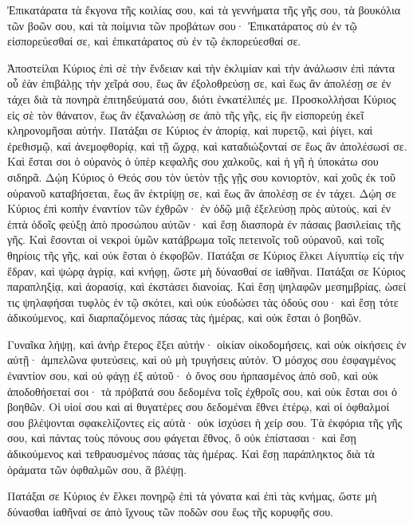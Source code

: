 {Ἐπικατάρατα τὰ ἔκγονα τῆς κοιλίας σου, καὶ τὰ γεννήματα τῆς γῆς σου, τὰ βουκόλια τῶν βοῶν σου, καὶ τὰ ποίμνια τῶν προβάτων σου·
Ἐπικατάρατος σὺ ἐν τῷ εἰσπορεύεσθαί σε, καὶ ἐπικατάρατος σὺ ἐν τῷ ἐκπορεύεσθαί σε.
\par }{\PP {}Ἀποστείλαι Κύριος ἐπὶ σὲ τὴν ἔνδειαν καὶ τὴν ἐκλιμίαν καὶ τὴν ἀνάλωσιν ἐπὶ πάντα οὗ ἐὰν ἐπιβάλῃς τὴν χεῖρά σου, ἕως ἂν ἐξολοθρεύσῃ σε, καὶ ἕως ἂν ἀπολέσῃ σε ἐν τάχει διὰ τὰ πονηρὰ ἐπιτηδεύματά σου, διότι ἐνκατέλιπές με.
Προσκολλήσαι Κύριος εἰς σὲ τὸν θάνατον, ἕως ἂν ἐξαναλώσῃ σε ἀπὸ τῆς γῆς, εἰς ἣν εἰσπορεύῃ ἐκεῖ κληρονομῆσαι αὐτήν.
Πατάξαι σε Κύριος ἐν ἀπορίᾳ, καὶ πυρετῷ, καὶ ῥίγει, καὶ ἐρεθισμῷ, καὶ ἀνεμοφθορίᾳ, καὶ τῇ ὤχρᾳ, καὶ καταδιώξονταί σε ἕως ἂν ἀπολέσωσί σε.
Καὶ ἔσται σοι ὁ οὐρανὸς ὁ ὑπὲρ κεφαλῆς σου χαλκοῦς, καὶ ἡ γῆ ἡ ὑποκάτω σου σιδηρᾶ.
Δῴη Κύριος ὁ Θεός σου τὸν ὑετὸν τῇς γῇς σου κονιορτὸν, καὶ χοῦς ἐκ τοῦ οὐρανοῦ καταβήσεται, ἕως ἂν ἐκτρίψῃ σε, καὶ ἕως ἂν ἀπολέσῃ σε ἐν τάχει.
Δῴη σε Κύριος ἐπὶ κοπὴν ἐναντίον τῶν ἐχθρῶν· ἐν ὁδῷ μιᾷ ἐξελεύσῃ πρὸς αὐτοὺς, καὶ ἐν ἑπτὰ ὁδοῖς φεύξῃ ἀπὸ προσώπου αὐτῶν· καὶ ἔσῃ διασπορὰ ἐν πάσαις βασιλείαις τῆς γῆς.
Καὶ ἔσονται οἱ νεκροὶ ὑμῶν κατάβρωμα τοῖς πετεινοῖς τοῦ οὐρανοῦ, καὶ τοῖς θηρίοις τῆς γῆς, καὶ οὐκ ἔσται ὁ ἐκφοβῶν.
Πατάξαι σε Κύριος ἕλκει Αἰγυπτίῳ εἰς τὴν ἕδραν, καὶ ψώρᾳ ἀγρίᾳ, καὶ κνήφῃ, ὥστε μὴ δύνασθαί σε ἰαθῆναι.
Πατάξαι σε Κύριος παραπληξίᾳ, καὶ ἀορασίᾳ, καὶ ἐκστάσει διανοίας.
Καὶ ἔσῃ ψηλαφῶν μεσημβρίας, ὡσεί τις ψηλαφήσαι τυφλὸς ἐν τῷ σκότει, καὶ οὐκ εὐοδώσει τὰς ὁδούς σου· καὶ ἔσῃ τότε ἀδικούμενος, καὶ διαρπαζόμενος πάσας τὰς ἡμέρας, καὶ οὐκ ἔσται ὁ βοηθῶν.
\par }{\PP {}Γυναῖκα λήψῃ, καὶ ἀνὴρ ἕτερος ἕξει αὐτήν· οἰκίαν οἰκοδομήσεις, καὶ οὐκ οἰκήσεις ἐν αὐτῇ· ἀμπελῶνα φυτεύσεις, καὶ οὐ μὴ τρυγήσεις αὐτόν.
Ὁ μόσχος σου ἐσφαγμένος ἐναντίον σου, καὶ οὐ φάγῃ ἐξ αὐτοῦ· ὁ ὄνος σου ἡρπασμένος ἀπὸ σοῦ, καὶ οὐκ ἀποδοθήσεταί σοι· τὰ πρόβατά σου δεδομένα τοῖς ἐχθροῖς σου,
καὶ οὐκ ἔσται σοι ὁ βοηθῶν. Οἱ υἱοί σου καὶ αἱ θυγατέρες σου δεδομέναι ἔθνει ἑτέρῳ, καὶ οἱ ὀφθαλμοί σου βλέψονται σφακελίζοντες εἰς αὐτὰ· οὐκ ἰσχύσει ἡ χείρ σου.
Τὰ ἐκφόρια τῆς γῆς σου, καὶ πάντας τοὺς πόνους σου φάγεται ἔθνος, ὃ οὐκ ἐπίστασαι· καὶ ἔσῃ ἀδικούμενος καὶ τεθραυσμένος πάσας τὰς ἡμέρας.
Καὶ ἔσῃ παράπληκτος διὰ τὰ ὁράματα τῶν ὀφθαλμῶν σου, ἃ βλέψῃ.
\par }{\PP {}Πατάξαι σε Κύριος ἐν ἕλκει πονηρῷ ἐπὶ τὰ γόνατα καὶ ἐπὶ τὰς κνήμας, ὥστε μὴ δύνασθαι ἰαθῆναί σε ἀπὸ ἴχνους τῶν ποδῶν σου ἕως τῆς κορυφῆς σου.
}
